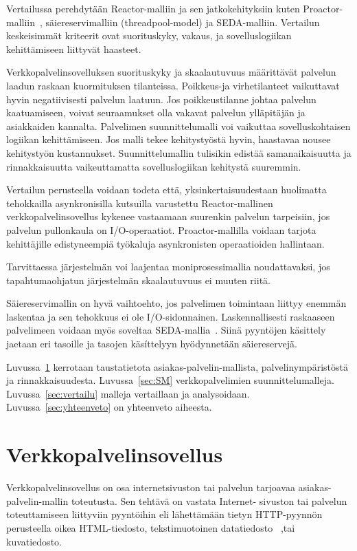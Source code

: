 \documentclass[finnish]{tktltiki2}
\theoremstyle{definition}
\theoremstyle{remark}
\begin{document}
Vertailussa perehdytään Reactor-malliin\cite{schmidt_reactor:_1995} ja sen jatkokehityksiin
kuten Proactor-malliin~\cite{pyarali_proactor_1997}, säiereservimalliin (threadpool-model)
ja SEDA-malliin.
Vertailun keskeisimmät kriteerit ovat suorituskyky, vakaus, ja
sovelluslogiikan kehittämiseen liittyvät haasteet.

Verkkopalvelinsovelluksen suorituskyky ja skaalautuvuus
määrittävät palvelun laadun raskaan kuormituksen tilanteissa.
Poikkeus-ja virhetilanteet vaikuttavat hyvin negatiivisesti
palvelun laatuun. Jos poikkeustilanne johtaa
palvelun kaatuamiseen, voivat seuraamukset olla vakavat
palvelun ylläpitäjän ja asiakkaiden kannalta.
Palvelimen suunnittelumalli voi vaikuttaa 
sovelluskohtaisen logiikan kehittämiseen.
Jos malli tekee kehitystyöstä hyvin, haastavaa
nousee kehitystyön kustannukset.
Suunnittelumallin tulisikin edistää
samanaikaisuutta ja rinnakkaisuutta vaikeuttamatta
sovelluslogiikan kehitystä suuremmin.

Vertailun perusteella voidaan todeta että,
yksinkertaisuudestaan huolimatta tehokkailla asynkronisilla
kutsuilla varustettu Reactor-mallinen verkkopalvelinsovellus
kykenee vastaamaan suurenkin palvelun tarpeisiin, jos palvelun
pullonkaula on I/O-operaatiot.
Proactor-mallilla voidaan tarjota kehittäjille edistyneempiä työkaluja
asynkronisten operaatioiden hallintaan.

Tarvittaessa järjestelmän voi laajentaa moniprosessimallia noudattavaksi,
jos tapahtumaohjatun järjestelmän skaalautuvuus ei muuten riitä.

Säiereservimallin on hyvä vaihtoehto, jos palvelimen
toimintaan liittyy enemmän laskentaa ja sen tehokkuus ei ole I/O-sidonnainen.
Laskennallisesti raskaaseen palvelimeen voidaan myös soveltaa SEDA-mallia~\cite{welsh_seda_2001}.
Siinä pyyntöjen käsittely jaetaan eri tasoille ja tasojen käsíttelyyn
hyödynnetään säiereservejä.

Luvussa~\ref{vps} kerrotaan taustatietota asiakas-palvelin-mallista, palvelinympäristöstä
ja rinnakkaisuudesta.
Luvussa~\ref{sec:SM} verkkopalvelimien suunnittelumalleja. Luvussa~\ref{sec:vertailu}
malleja vertaillaan ja analysoidaan. Luvussa~\ref{sec:yhteenveto} on yhteenveto aiheesta.

\section{Verkkopalvelinsovellus}\label{vps}
Verkkopalvelinsovellus on osa internetsivuston tai palvelun tarjoavaa
asiakas-palvelin-mallin toteutusta. 
Sen tehtävä on vastata Internet-
sivuston tai palvelun toteuttamiseen
liittyviin pyyntöihin eli lähettämään tietyn HTTP-pyynnön
perusteella oikea HTML-tiedosto, tekstimuotoinen datatiedosto~\cite{Berners-Lee_1994}
,tai kuvatiedosto.
\end{document}
